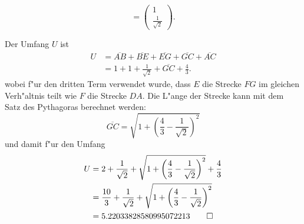 \begin{loesung}
\begin{teilaufgaben}
\begin{enumerate}
\[=
\begin{pmatrix}1\\\frac1{\sqrt{2}}\end{pmatrix}.
\]
\end{enumerate}
\item
Der Umfang $U$ ist
\begin{align*}
U
&=
\overline{AB} + \overline{BE} + \overline{EG} + \overline{GC} +\overline{AC}
\\
&=
1 + 1 + \frac1{\sqrt{2}}+\overline{GC} + \frac43.
\end{align*}
wobei f"ur den dritten Term verwendet wurde, dass $E$ die Strecke
$FG$ im gleichen Verh"altnis teilt wie $F$ die Strecke $DA$.
Die L"ange der Strecke kann mit dem Satz des Pythagoras berechnet
werden:
\[
\overline{GC}
=
\sqrt{1+\left(\frac43-\frac1{\sqrt{2}}\right)^2}
\]
und damit f"ur den Umfang
\begin{align*}
U
&=
 2
+ \frac1{\sqrt{2}}
+ \sqrt{1+\left(\frac43-\frac1{\sqrt{2}}\right)^2}
+ \frac43
\\
&=
\frac{10}{3}
+ \frac1{\sqrt{2}}
+ \sqrt{1+\left(\frac43-\frac1{\sqrt{2}}\right)^2}
\\
&=
5.22033828580995072213
\qedhere
\end{align*}
\end{teilaufgaben}
\end{loesung}


